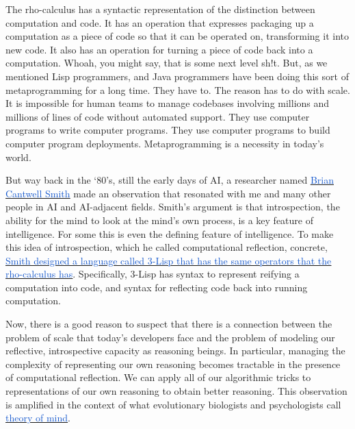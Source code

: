 \documentclass[10pt]{report}
\begin{document}
The rho-calculus has a syntactic representation of the distinction between computation and code. It has an operation that expresses packaging up a computation as a piece of code so that it can be operated on, transforming it into new code. It also has an operation for turning a piece of code back into a computation. Whoah, you might say, that is some next level sh!t. But, as we mentioned Lisp programmers, and Java programmers have been doing this sort of metaprogramming for a long time. They have to. The reason has to do with scale. It is impossible for human teams to manage codebases involving millions and millions of lines of code without automated support. They use computer programs to write computer programs. They use computer programs to build computer program deployments. Metaprogramming is a necessity in today’s world.

\vspace{1\baselineskip}
But way back in the ‘80’s, still the early days of AI, a researcher named \href{https://en.wikipedia.org/wiki/Brian_Cantwell_Smith#:~:text=Brian\%20Cantwell\%20Smith\%20is\%20a,\%2C\%20and\%20philosophy\%2C\%20especially\%20ontology.}{\uline{\textcolor[HTML]{1155CC}{Brian Cantwell Smith}}} made an observation that resonated with me and many other people in AI and AI-adjacent fields. Smith’s argument is that introspection, the ability for the mind to look at the mind’s own process, is a key feature of intelligence. For some this is even the defining feature of intelligence. To make this idea of introspection, which he called computational reflection, concrete, \href{https://www.ics.uci.edu/~jajones/INF102-S18/readings/17_Smith84.pdf}{\uline{\textcolor[HTML]{1155CC}{Smith designed a language called 3-Lisp that has the same operators that the rho-calculus has}}}. Specifically, 3-Lisp has syntax to represent reifying a computation into code, and syntax for reflecting code back into running computation.

\vspace{1\baselineskip}
Now, there is a good reason to suspect that there is a connection between the problem of scale that today’s developers face and the problem of modeling our reflective, introspective capacity as reasoning beings. In particular, managing the complexity of representing our own reasoning becomes tractable in the presence of computational reflection. We can apply all of our algorithmic tricks to representations of our own reasoning to obtain better reasoning. This observation is amplified in the context of what evolutionary biologists and psychologists call \href{https://en.wikipedia.org/wiki/Theory_of_mind}{\uline{\textcolor[HTML]{1155CC}{theory of mind}}}. 
\end{document}
